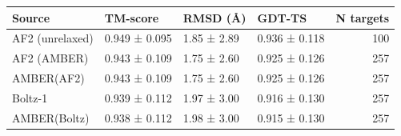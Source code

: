 \begin{tabular}{llllr}
\toprule
Source & TM-score & RMSD (Å) & GDT-TS & N targets \\
\midrule
AF2 (unrelaxed) & 0.949 ± 0.095 & 1.85 ± 2.89 & 0.936 ± 0.118 & 100 \\
AF2 (AMBER) & 0.943 ± 0.109 & 1.75 ± 2.60 & 0.925 ± 0.126 & 257 \\
AMBER(AF2) & 0.943 ± 0.109 & 1.75 ± 2.60 & 0.925 ± 0.126 & 257 \\
Boltz-1 & 0.939 ± 0.112 & 1.97 ± 3.00 & 0.916 ± 0.130 & 257 \\
AMBER(Boltz) & 0.938 ± 0.112 & 1.98 ± 3.00 & 0.915 ± 0.130 & 257 \\
\bottomrule
\end{tabular}
